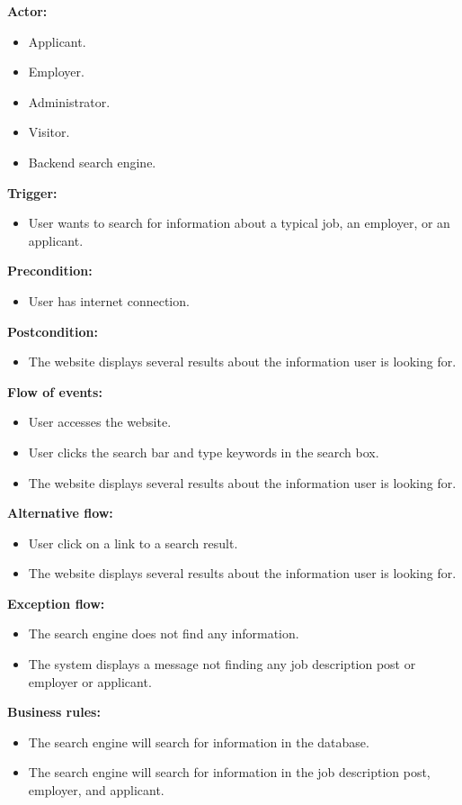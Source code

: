 \documentclass[a4paper]{article}
\begin{document}
        \textbf{Actor:}
        \begin{itemize}
            \item Applicant.
            \item Employer.
            \item Administrator.
            \item Visitor.
            \item Backend search engine.
        \end{itemize}

        \textbf{Trigger:}
        \begin{itemize}
            \item User wants to search for information about a typical job, an employer, or an applicant.
        \end{itemize}

        \textbf{Precondition:}
        \begin{itemize}
            \item User has internet connection.
        \end{itemize}

        \textbf{Postcondition:}
        \begin{itemize}
            \item The website displays several results about the information user is looking for.
        \end{itemize}
        
        \textbf{Flow of events:}
        \begin{itemize}
            \item User accesses the website.
            \item User clicks the search bar and type keywords in the search box.
            \item The website displays several results about the information user is looking for.
        \end{itemize}

        \textbf{Alternative flow:}
        \begin{itemize}
            \item User click on a link to a search result.
            \item The website displays several results about the information user is looking for.
        \end{itemize}

        \textbf{Exception flow:}
        \begin{itemize}
            \item The search engine does not find any information.
            \item The system displays a message not finding any job description post or employer or applicant.
        \end{itemize}

        \textbf{Business rules:}
        \begin{itemize}
            \item The search engine will search for information in the database.
            \item The search engine will search for information in the job description post, employer, and applicant.
        \end{itemize}
\section{}
\end{document}

